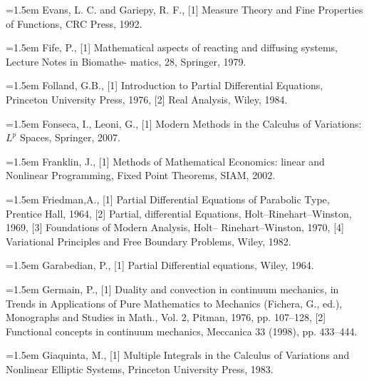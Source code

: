 \noindent\hangindent=1.5em Evans, L. C. and Gariepy, R. F., \hypertarget{ref:EvansGariepy-1}{[1]} Measure Theory and Fine Properties of Functions, CRC Press, 1992.\par{}
\noindent\hangindent=1.5em Fife, P., \hypertarget{ref:Fife-1}{[1]} Mathematical aspects of reacting and diffusing systems, Lecture Notes in Biomathe- matics, 28, Springer, 1979.\par{}
\noindent\hangindent=1.5em Folland, G.B., \hypertarget{ref:Folland-1}{[1]} Introduction to Partial Differential Equations, Princeton University Press, 1976, \hypertarget{ref:Folland-2}{[2]} Real Analysis, Wiley, 1984.\par{}
\noindent\hangindent=1.5em Fonseca, I., Leoni, G., \hypertarget{ref:FonsecaLeoni-1}{[1]} Modern Methods in the Calculus of Variations: $L^p$ Spaces, Springer, 2007.\par{}
\noindent\hangindent=1.5em Franklin, J., \hypertarget{ref:Franklin-1}{[1]} Methods of Mathematical Economics: linear and Nonlinear Programming, Fixed Point Theorems, SIAM, 2002.\par{}
\noindent\hangindent=1.5em Friedman,A., \hypertarget{ref:Friedman-1}{[1]} Partial Differential Equations of Parabolic Type, Prentice Hall, 1964, \hypertarget{ref:Friedman-2}{[2]} Partial, differential Equations, Holt--Rinehart--Winston, 1969, \hypertarget{ref:Friedman-3}{[3]} Foundations of Modern Analysis, Holt-- Rinehart--Winston, 1970, \hypertarget{ref:Friedman-4}{[4]} Variational Principles and Free Boundary Problems, Wiley, 1982.\par{}
\noindent\hangindent=1.5em Garabedian, P., \hypertarget{ref:Garabedian-1}{[1]} Partial Differential equations, Wiley, 1964.\par{}
\noindent\hangindent=1.5em Germain, P., \hypertarget{ref:Germain-1}{[1]} Duality and convection in continuum mechanics, in Trends in Applications of Pure Mathematics to Mechanics (Fichera, G., ed.), Monographs and Studies in Math., Vol. 2, Pitman, 1976, pp. 107--128, \hypertarget{ref:Germain-2}{[2]} Functional concepts in continuum mechanics, Meccanica 33 (1998), pp. 433--444.\par{}
\noindent\hangindent=1.5em Giaquinta, M., \hypertarget{ref:Giaquinta-1}{[1]} Multiple Integrals in the Calculus of Variations and Nonlinear Elliptic Systems, Princeton University Press, 1983.\par{}
